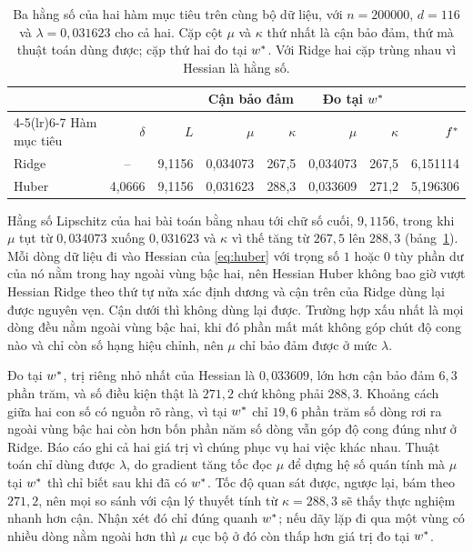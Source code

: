 \documentclass[12pt, a4paper, oneside]{report}
\theoremstyle{definition}
\begin{document}
\begin{table}[tbp]
  \centering
  \caption{Ba hằng số của hai hàm mục tiêu trên cùng bộ dữ liệu, với
    $n = \num{200000}$, $d = 116$ và $\lambda = 0{,}031623$ cho cả hai. Cặp cột
    $\mu$ và $\kappa$ thứ nhất là cận bảo đảm, thứ mà thuật toán dùng được; cặp
    thứ hai đo tại $w^{*}$. Với Ridge hai cặp trùng nhau vì Hessian là hằng số.}
  \label{tab:huber-constants}
  \begin{tabular}{lrrrrrrr}
    \toprule
    & & & \multicolumn{2}{c}{Cận bảo đảm} & \multicolumn{2}{c}{Đo tại $w^{*}$} & \\
    \cmidrule(lr){4-5}\cmidrule(lr){6-7}
    Hàm mục tiêu & $\delta$ & $L$ & $\mu$ & $\kappa$ & $\mu$ & $\kappa$ & $f^{*}$ \\
    \midrule
    Ridge & \multicolumn{1}{c}{--} & 9{,}1156 & 0{,}034073 & 267{,}5 & 0{,}034073 & 267{,}5 & 6{,}151114 \\
    Huber & 4{,}0666               & 9{,}1156 & 0{,}031623 & 288{,}3 & 0{,}033609 & 271{,}2 & 5{,}196306 \\
    \bottomrule
  \end{tabular}
\end{table}

Hằng số Lipschitz của hai bài toán bằng nhau tới chữ số cuối, $9{,}1156$, trong
khi $\mu$ tụt từ $0{,}034073$ xuống $0{,}031623$ và $\kappa$ vì thế tăng từ
$267{,}5$ lên $288{,}3$ (bảng~\ref{tab:huber-constants}). Mỗi dòng dữ liệu đi vào
Hessian của \eqref{eq:huber} với trọng số $1$ hoặc $0$ tùy phần dư của nó nằm
trong hay ngoài vùng bậc hai, nên Hessian Huber không bao giờ vượt Hessian Ridge
theo thứ tự nửa xác định dương và cận trên của Ridge dùng lại được nguyên vẹn.
Cận dưới thì không dùng lại được. Trường hợp xấu nhất là mọi dòng đều nằm ngoài
vùng bậc hai, khi đó phần mất mát không góp chút độ cong nào và chỉ còn số hạng
hiệu chỉnh, nên $\mu$ chỉ bảo đảm được ở mức $\lambda$.

Đo tại $w^{*}$, trị riêng nhỏ nhất của Hessian là $0{,}033609$, lớn hơn cận bảo
đảm $6{,}3$ phần trăm, và số điều kiện thật là $271{,}2$ chứ không phải $288{,}3$.
Khoảng cách giữa hai con số có nguồn rõ ràng, vì tại $w^{*}$ chỉ $19{,}6$ phần
trăm số dòng rơi ra ngoài vùng bậc hai còn hơn bốn phần năm số dòng vẫn góp độ
cong đúng như ở Ridge. Báo cáo ghi cả hai giá trị vì chúng phục vụ hai việc khác
nhau. Thuật toán chỉ dùng được $\lambda$, do gradient tăng tốc đọc $\mu$ để dựng
hệ số quán tính mà $\mu$ tại $w^{*}$ thì chỉ biết sau khi đã có $w^{*}$. Tốc độ
quan sát được, ngược lại, bám theo $271{,}2$, nên mọi so sánh với cận lý thuyết
tính từ $\kappa = 288{,}3$ sẽ thấy thực nghiệm nhanh hơn cận. Nhận xét đó chỉ đúng
quanh $w^{*}$; nếu dãy lặp đi qua một vùng có nhiều dòng nằm ngoài hơn thì $\mu$
cục bộ ở đó còn thấp hơn giá trị đo tại $w^{*}$.
\end{document}
